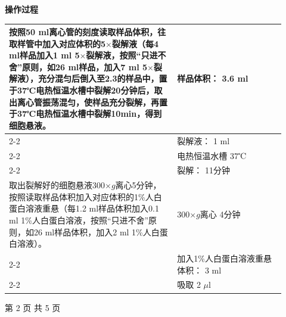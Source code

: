 \documentclass[UTF8,10pt,a4paper,fontset=fandol]{ctexart}
\newcommand{\fieldvalue}[1]{#1}
\newcommand{\handwritten}[1]{#1}
\begin{document}
\noindent\textbf{操作过程}

\begin{tabular}{|p{0.56\linewidth}|p{0.36\linewidth}|}
\hline
按照50 ml离心管的刻度读取样品体积，往取样管中加入对应体积的5$\times$裂解液（每4 ml样品加入1 ml 5$\times$裂解液，按照“只进不舍”原则，如26 ml样品，加入7 ml 5$\times$裂解液），充分混匀后倒入至2.3的样品中，置于37℃电热恒温水槽中裂解20分钟后，取出离心管振荡混匀，使样品充分裂解，再置于37℃电热恒温水槽中裂解10min，得到细胞悬液。 &
样品体积：
\fieldvalue{\handwritten{3.6}} ml \\ \cline{2-2}
&
裂解液：
\fieldvalue{\handwritten{1}} ml \\ \cline{2-2}
&
电热恒温水槽
\fieldvalue{\handwritten{37}}℃ \\ \cline{2-2}
&
裂解：
\fieldvalue{\handwritten{11分钟}} \\ \hline
取出裂解好的细胞悬液300$\times g$离心5分钟，按照读取样品体积加入对应体积的1\%人白蛋白溶液重悬（每1.2 ml样品体积加入0.1 ml 1\%人白蛋白溶液，按照“只进不舍”原则，如26 ml样品体积，加入2 ml 1\%人白蛋白溶液）。 &
\fieldvalue{\handwritten{300}}$\times g$离心
\fieldvalue{\handwritten{4}}分钟 \\ \cline{2-2}
&
加入1\%人白蛋白溶液重悬体积：
\fieldvalue{\handwritten{3}} ml \\ \cline{2-2}
&
吸取
\fieldvalue{\handwritten{2}} $\mu$l \\ \hline
\end{tabular}

\begin{center}
第 2 页 共 5 页
\end{center}

\newpage
\end{document}
